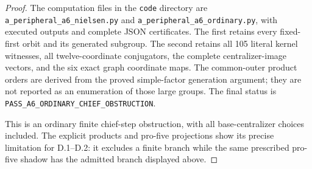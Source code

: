 \begin{proof}
The computation files in
the \texttt{code} directory
are
\texttt{a\_peripheral\_a6\_nielsen.py}
and
\texttt{a\_peripheral\_a6\_ordinary.py},
with executed outputs and
complete JSON certificates.
The first retains every
fixed-first orbit and its
generated subgroup.
The second retains all
105 literal kernel witnesses,
all twelve-coordinate
conjugators, the complete
centralizer-image vectors,
and the six exact graph
coordinate maps.
The common-outer product
orders are derived from
the proved simple-factor
generation argument; they
are not reported as an
enumeration of those large
groups.
The final status is
\texttt{PASS\_A6\_ORDINARY\_CHIEF\_OBSTRUCTION}.

This is an ordinary finite
chief-step obstruction,
with all base-centralizer
choices included.
The explicit products and
pro-five projections show
its precise limitation for
D.1--D.2: it excludes a
finite branch while the
same prescribed pro-five
shadow has the admitted
branch displayed above.
\end{proof}
